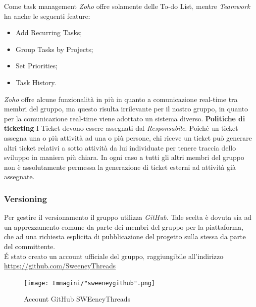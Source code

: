 \documentclass[a4paper]{article}
\begin{document}
	Come task management \emph{Zoho} offre solamente delle To-do List, mentre \emph{Teamwork} ha anche le seguenti
	feature:
	\begin{itemize}
		\item Add Recurring Tasks;
		\item Group Tasks by Projects;
		\item Set Priorities;
		\item Task History.
	\end{itemize}
	\emph{Zoho} offre alcune funzionalità in più in quanto a comunicazione real-time tra membri del gruppo,
	ma questo risulta irrilevante per il nostro gruppo, in quanto per la comunicazione real-time viene
	adottato un sistema diverso.
	\textbf{Politiche di ticketing}
		I Ticket devono essere assegnati dal \emph{Responsabile}. Poiché un ticket assegna una o più attività ad una o più
		persone, chi riceve un ticket può generare altri ticket relativi a sotto attività da lui individuate per tenere traccia
		dello sviluppo in maniera più chiara. In ogni caso a tutti gli altri membri del gruppo non è assolutamente permessa la
		 generazione di ticket esterni ad attività già assegnate.
	\subsubsection{Versioning}
	Per gestire il versionamento il gruppo utilizza \emph{GitHub}. Tale scelta è dovuta sia ad un apprezzamento
	comune da parte dei membri del gruppo per la piattaforma, che ad una richiesta esplicita di pubblicazione del
	progetto sulla stessa da parte del committente. \\
	\'E stato creato un account ufficiale del gruppo, raggiungibile all'indirizzo
	\url{https://github.com/SweeneyThreads}
	\begin{figure}[H]
		\centering
		\texttt{[image: Immagini/"sweeneygithub".png]}
		\caption{Account GitHub SWEeneyThreads}
	\end{figure}
\end{document}
